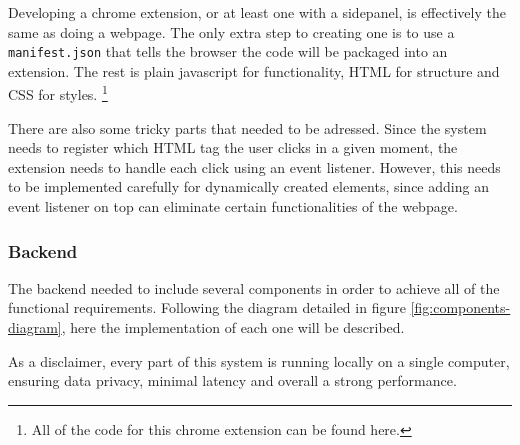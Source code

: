 Developing a chrome extension, or at least one with a sidepanel, is effectively the same as doing a webpage. The only extra step to creating one is to use a \verb|manifest.json| that tells the browser the code will be packaged into an extension. The rest is plain javascript for functionality, HTML for structure and CSS for styles. \footnote{All of the code for this chrome extension can be found here.} %

There are also some tricky parts that needed to be adressed. Since the system needs to register which HTML tag the user clicks in a given moment, the extension needs to handle each click using an event listener. However, this needs to be implemented carefully for dynamically created elements, since adding an event listener on top can eliminate certain functionalities of the webpage.


\subsubsection{Backend}

The backend needed to include several components in order to achieve all of the functional requirements. Following the diagram detailed in figure \ref{fig:components-diagram}, here the implementation of each one will be described.

As a disclaimer, every part of this system is running locally on a single computer, ensuring data privacy, minimal latency and overall a strong performance.

